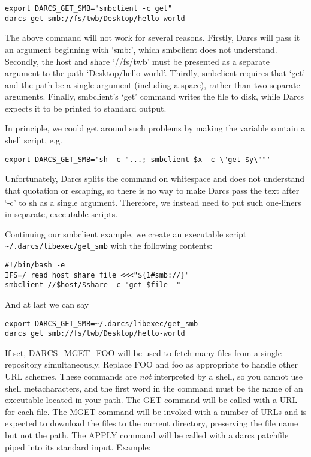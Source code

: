 \begin{verbatim}
export DARCS_GET_SMB="smbclient -c get"
darcs get smb://fs/twb/Desktop/hello-world
\end{verbatim}

The above command will not work for several reasons.  Firstly, Darcs
will pass it an argument beginning with `smb:', which smbclient does
not understand.  Secondly, the host and share `//fs/twb' must be
presented as a separate argument to the path `Desktop/hello-world'.
Thirdly, smbclient requires that `get' and the path be a single
argument (including a space), rather than two separate arguments.
Finally, smbclient's `get' command writes the file to disk, while
Darcs expects it to be printed to standard output.

In principle, we could get around such problems by making the variable
contain a shell script, e.g.

\begin{verbatim}
export DARCS_GET_SMB='sh -c "...; smbclient $x -c \"get $y\""'
\end{verbatim}

Unfortunately, Darcs splits the command on whitespace and does not
understand that quotation or escaping, so there is no way to make
Darcs pass the text after `-c' to sh as a single argument.  Therefore,
we instead need to put such one-liners in separate, executable scripts.

Continuing our smbclient example, we create an executable script
\verb|~/.darcs/libexec/get_smb| with the following contents:

\begin{verbatim}
#!/bin/bash -e
IFS=/ read host share file <<<"${1#smb://}"
smbclient //$host/$share -c "get $file -"
\end{verbatim}

And at last we can say

\begin{verbatim}
export DARCS_GET_SMB=~/.darcs/libexec/get_smb
darcs get smb://fs/twb/Desktop/hello-world
\end{verbatim}


If set, DARCS\_MGET\_FOO
will be used to fetch many files from a single repository simultaneously.
Replace FOO and foo as appropriate to handle other URL schemes.
These commands are \emph{not} interpreted by a shell, so you cannot
use shell metacharacters, and the first word in the command must
be the name of an executable located in your path. The GET command
will be called with a URL for each file.  The MGET command will be
invoked with a number of URLs and is expected to download the files
to the current directory, preserving the file name but not the path.
The APPLY command will be called with a darcs patchfile piped into
its standard input. Example:

